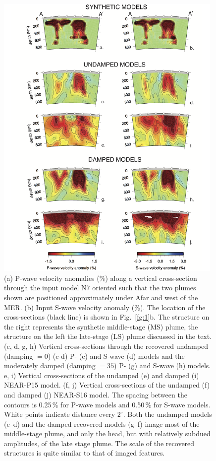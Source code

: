 \documentclass[a4paper,10pt,twocolumn]{paper}
\begin{document}
\begin{figure}
\centering
\includegraphics[width=11cm]{../figures-working/fig07.png}
\caption{(a) P-wave velocity anomalies (\%) along a vertical cross-section through the input model N7 oriented such that the two plumes shown are positioned approximately under Afar and west of the MER. (b) Input S-wave velocity anomaly (\%). The location of the cross-sections (black line) is shown in Fig.~\ref{fg:1}b. The structure on the right represents the synthetic middle-stage (MS) plume, the structure on the left the late-stage (LS) plume discussed in the text. (c, d, g, h) Vertical cross-sections through the recovered undamped (damping $=0$) (c-d) P- (c) and S-wave (d) models and the moderately damped (damping $=35$) P- (g) and S-wave (h) models. e, i) Vertical cross-sections of the undamped (e) and damped (i) NEAR-P15 model. (f, j) Vertical cross-sections of the undamped (f) and damped (j) NEAR-S16 model. The spacing between the contours is 0.25\,\% for P-wave models and 0.50\,\% for S-wave models. White points indicate distance every $2^{\circ}$. Both the undamped models (c–d) and the damped recovered models (g–f) image most of the middle-stage plume, and only the head, but with relatively subdued amplitudes, of the late stage plume. The scale of the recovered structures is quite similar to that of imaged features.}
\label{fg:7}
\end{figure}
\end{document}
